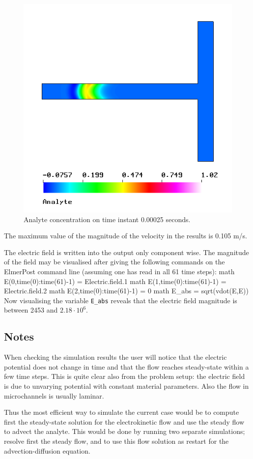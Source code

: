 \begin{figure}[bht]
\begin{center}
  \includegraphics[height=0.55\textwidth]{analyte_tutorial.png}
\end{center}
\caption{Analyte concentration on time instant 0.00025 seconds.}
\label{fig:analyte_ek}
\end{figure}
 
The maximum value of the magnitude of the velocity in the results is
0.105 m/s.

The electric field is written into the output only component wise. The
magnitude of the field may be visualised after giving the following
commands on the ElmerPost command line (assuming one has read in all
61 time steps):
%
\ttbegin
math E(0,time(0):time(61)-1) = Electric.field.1
math E(1,time(0):time(61)-1) = Electric.field.2
math E(2,time(0):time(61)-1) = 0
math E_abs = sqrt(vdot(E,E))
\ttend
%
Now visualising the variable \texttt{E\_abs} reveals that the electric
field magnitude is between 2453 and $2.18\cdot10^6$.


\subsection*{Notes}

When checking the simulation results the user will notice that the
electric potential does not change in time and that the flow reaches
steady-state within a few time steps. This is quite clear also from the
problem setup: the electric field is due to unvarying potential with
constant material parameters. Also the flow in microchannels is
usually laminar.

Thus the most efficient way to simulate the current case would be to
compute first the steady-state solution for the electrokinetic flow
and use the steady flow to advect the analyte. This would be done by
running two separate simulations; resolve first the steady flow,
and to use this flow solution as restart for the advection-diffusion
equation.



\hfill